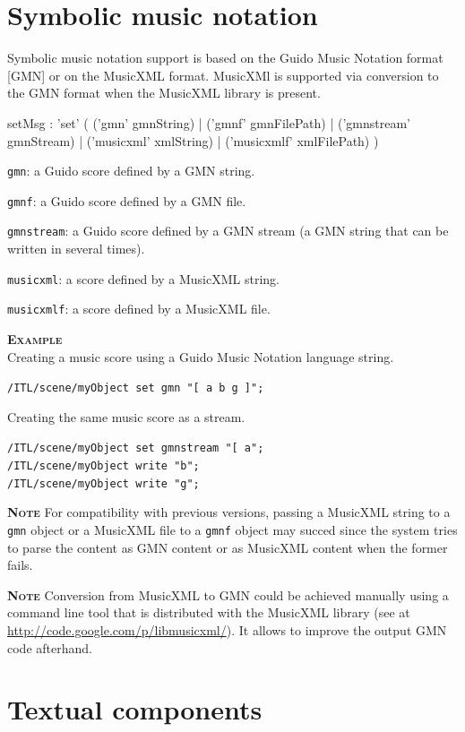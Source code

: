 \documentclass[a4paper,twoside]{report}
\newcommand{\sublevel}[1]	{\section{#1}}
\newcommand{\OSC}[1]		{\texttt{#1}}
\newcommand{\example}		{\textbf{\hspace{-1.5cm}\textbf{\textsc{Example }}}}
\newcommand{\note}	[1]		{\vspace{2mm}\textbf{\hspace{-1.03cm}\textbf{\textsc{Note #1}}}}
\let\olditemize\itemize
\let\oldenditemize\enditemize
\renewenvironment{itemize} 	{\olditemize \setlength{\itemsep}{1mm}}{\oldenditemize}
\newcommand{\sample}	[1]			{\vspace{-2mm}\begin{center}\colorbox{mygrey}{
								\begin{minipage}[t]{0.9\columnwidth} 
								{\small \texttt{#1}}
								\end{minipage}}\end{center}}
\begin{document}
\sublevel{Symbolic music notation}
\label{symscore}

Symbolic music notation support is based on the Guido Music Notation format [GMN] or on the MusicXML format. MusicXMl is supported via conversion to the GMN format when the MusicXML library is present.

\begin{rail}
setMsg : 'set' (
	('gmn' gmnString) |
	('gmnf' gmnFilePath) |
	('gmnstream' gmnStream) |
	('musicxml' xmlString) |
	('musicxmlf' xmlFilePath)
)
\end{rail}

\begin{itemize}
\item \OSC{gmn}: a Guido score defined by a GMN string.
\item \OSC{gmnf}: a Guido score defined by a GMN file.
\item \OSC{gmnstream}: a Guido score defined by a GMN stream (a GMN string that can be written in several times).
\item \OSC{musicxml}: a score defined by a MusicXML string.
\item \OSC{musicxmlf}: a score defined by a MusicXML file.
\end{itemize}

\example \\
Creating a music score using a Guido Music Notation language string.
\sample{/ITL/scene/myObject set gmn "[ a b g ]";}
Creating the same music score as a stream.
\sample{/ITL/scene/myObject set gmnstream "[ a";\\
/ITL/scene/myObject write "b";\\
/ITL/scene/myObject write "g";
}

\note{} For compatibility with previous versions, passing a MusicXML string to a \OSC{gmn} object or a MusicXML file to a \OSC{gmnf} object may succed since the system tries to parse the content as GMN content or as MusicXML content when the former fails.

\note{} Conversion from MusicXML to GMN could be achieved manually using a command line tool that is distributed with the MusicXML library (see at \url{http://code.google.com/p/libmusicxml/}). It allows to improve the output GMN code afterhand.

\sublevel{Textual components}
\label{textscore}
\end{document}
